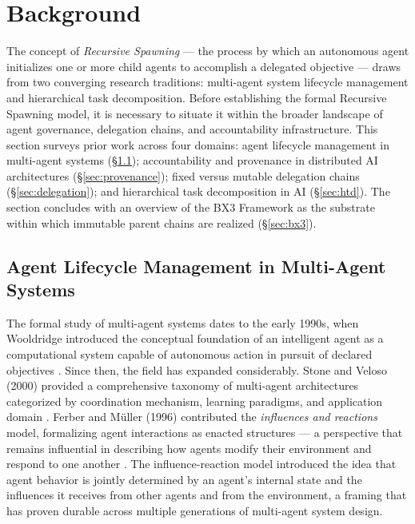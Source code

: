 \section{Background}
\label{sec:background}

The concept of \textit{Recursive Spawning} — the process by which an autonomous agent initializes one or more child agents to accomplish a delegated objective — draws from two converging research traditions: multi-agent system lifecycle management and hierarchical task decomposition. Before establishing the formal Recursive Spawning model, it is necessary to situate it within the broader landscape of agent governance, delegation chains, and accountability infrastructure. This section surveys prior work across four domains: agent lifecycle management in multi-agent systems (\S\ref{sec:lifecycle}); accountability and provenance in distributed AI architectures (\S\ref{sec:provenance}); fixed versus mutable delegation chains (\S\ref{sec:delegation}); and hierarchical task decomposition in AI (\S\ref{sec:htd}). The section concludes with an overview of the BX3 Framework as the substrate within which immutable parent chains are realized (\S\ref{sec:bx3}).

\subsection{Agent Lifecycle Management in Multi-Agent Systems}
\label{sec:lifecycle}

The formal study of multi-agent systems dates to the early 1990s, when Wooldridge introduced the conceptual foundation of an intelligent agent as a computational system capable of autonomous action in pursuit of declared objectives \cite{wooldridge1995}. Since then, the field has expanded considerably. Stone and Veloso (2000) provided a comprehensive taxonomy of multi-agent architectures categorized by coordination mechanism, learning paradigms, and application domain \cite{stone2000}. Ferber and M\"uller (1996) contributed the \textit{influences and reactions} model, formalizing agent interactions as enacted structures — a perspective that remains influential in describing how agents modify their environment and respond to one another \cite{ferber1996}. The influence-reaction model introduced the idea that agent behavior is jointly determined by an agent's internal state and the influences it receives from other agents and from the environment, a framing that has proven durable across multiple generations of multi-agent system design.

